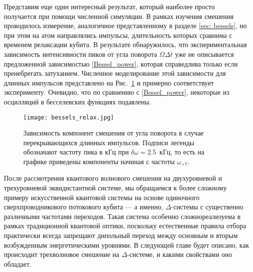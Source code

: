 Представим еще один интересный результат, который наиболее просто получается при помощи численной симуляции. В рамках изучения смешения проводилось измерение, аналогичное представленному в разделе \ref{sec: bessels}, но при этом на атом направлялись импульсы, длительность которых сравнима с временем релаксации кубита. В результате обнаружилось, что экспериментальная зависимость интенсивности пиков от угла поворота $\Omega\Delta t$ уже не описывается предложенной зависимостью \eqref{Bessel_power}, которая справедлива только если пренебрегать затуханием. Численное моделирование этой зависимости для длинных импульсов представлено на Рис.~\ref{fig: bessels_relax} и примерно соответствует эксперименту. Очевидно, что по сравнению с \eqref{Bessel_power}, некоторые из осцилляций в бесселевских функциях подавлены. 
\begin{figure}
	\centering
	\texttt{[image: bessels\_relax.jpg]}
	\caption[Зависимость компонент смешения от угла поворота в случае перекрывающихся длинных импульсов.]{Зависимость компонент смешения от угла поворота в случае перекрывающихся длинных импульсов. Подписи легенды обозначают частоту пика в кГц при $\delta\omega=2.5$~кГц, то есть на графике приведены компоненты начиная с частоты $\omega_{+7}$.}
	\label{fig: bessels_relax}
\end{figure} 

После рассмотрения квантового волнового смешения на двухуровневой и трехуровневой эквидистантной системе, мы обращаемся к более сложному примеру искусственной квантовой системы на основе одиночного сверхпроводникового потокового кубита --- а именно, $\Delta$-системы с существенно различными частотами переходов. Такая система особенно сложнореализуема в рамках традиционной квантовой оптики, поскольку естественные правила отбора практически всегда запрещают дипольный переход между основным и вторым возбужденным энергетическими уровнями. В следующей главе будет описано, как происходит трехволновое смешение на $\Delta$-системе, и какими свойствами оно обладает. 


